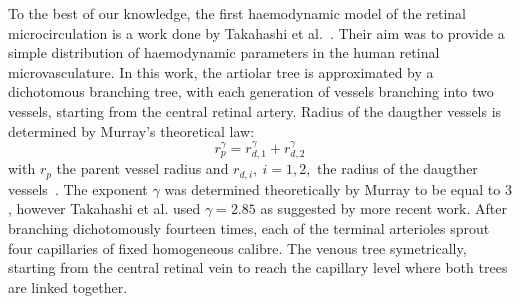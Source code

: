 \documentclass[12pt,a4paper]{article}
\begin{document}
To the best of our knowledge, the first haemodynamic model of the retinal microcirculation is a work done by Takahashi et al.~\cite{Takahashi_2009}.
Their aim was to provide a simple distribution of haemodynamic parameters in the human retinal microvasculature.
In this work, the artiolar tree is approximated by a dichotomous branching tree, with each generation of vessels branching into two vessels, starting from the central retinal artery.
Radius of the daugther vessels is determined by Murray's theoretical law:
\begin{equation}
  \label{eq:MurrayLaw}
  r_p^\gamma = r_{d,1}^\gamma + r_{d,2}^\gamma
\end{equation}
with $r_p$ the parent vessel radius and $r_{d,i},~i=1,2,$ the radius of the daugther vessels~\cite{Murray_1926}.
The exponent $\gamma$ was determined theoretically by Murray to be equal to $3$, however Takahashi et al. used $\gamma=2.85$ as suggested by more recent work.
After branching dichotomously fourteen times, each of the terminal arterioles sprout four capillaries of fixed homogeneous calibre. 
The venous tree symetrically, starting from the central retinal vein to reach the capillary level where both trees are linked together.
\end{document}
